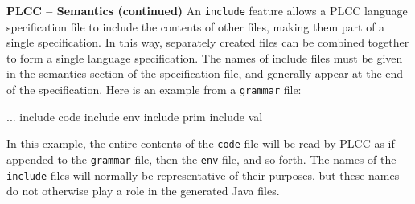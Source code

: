\begin{minipage}[t]{\sw}
\slidenumber
\LARGE
{\bf PLCC -- Semantics (continued)}\exx
An \verb'include' feature allows a PLCC language specification file
to include the contents of other files,
making them part of a single specification.
In this way, separately created files
can be combined together to form a single language specification.
The names of include files must be given in the semantics section
of the specification file, and generally appear
at the end of the specification.
Here is an example from a \verb'grammar' file:
\begin{qv}
...
include code
include env
include prim
include val
\end{qv}
In this example, the entire contents of the \verb'code' file will be
read by PLCC as if appended to the \verb'grammar' file,
then the \verb'env' file, and so forth.
The names of the \verb'include' files
will normally be representative of their purposes,
but these names do not otherwise play a role
in the generated Java files.
\end{minipage}
\clearpage
